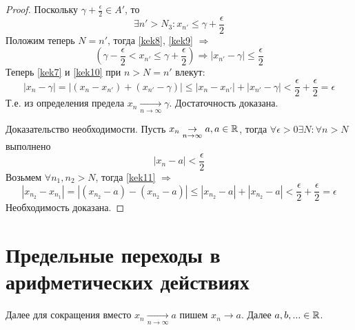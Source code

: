 \documentclass[main]{subfiles}
\begin{document}
\begin{proof}
    Поскольку $\gamma + \frac{\epsilon}{2} \in A'$, то 
    \begin{equation}\label{kek9}
        \exists n' > N_3 : x_{n'} \leq \gamma + \frac{\epsilon}{2}
    \end{equation}
    Положим теперь $N = n'$, тогда \ref{kek8}, \ref{kek9} $\Rightarrow$
    \begin{equation}\label{kek10}
        \left( 
            \gamma - \frac{\epsilon}{2} < x_{n'} \leq \gamma + \frac{\epsilon}{2}
        \right) \Rightarrow
        |x_{n'} - \gamma| \leq \frac{\epsilon}{2}
    \end{equation}
    Теперь \ref{kek7} и \ref{kek10} при $n > N = n'$ влекут:
    \begin{equation}
        |x_{n} - \gamma| = |(x_{n} - x_{n'}) + (x_{n'} - \gamma)| \leq 
        |x_{n} - x_{n'}| + |x_{n'} - \gamma| < \frac{\epsilon}{2} + 
        \frac{\epsilon}{2} = \epsilon
    \end{equation}
    Т.е. из определения предела $x_n \underset{n\to\infty}{\to} \gamma$.
    Достаточность доказана.

    Доказательство необходимости. Пусть $x_n \underset{n\to\infty}{\to} a,
    a \in \mathbb{R}$, тогда $\forall \epsilon > 0 \exists N : \forall n > N$
    выполнено 
    \begin{equation}\label{kek11}
        |x_n - a| < \frac{\epsilon}{2}
    \end{equation}
    Возьмем $\forall n_1, n_2 > N$, тогда \ref{kek11} $\Rightarrow$
    \begin{equation*}
        |x_{n_2} - x_{n_1}| = |(x_{n_2} - a) - (x_{n_2} - a)| \leq 
        |x_{n_2} - a| + |x_{n_2} - a| < \frac{\epsilon}{2} + \frac{\epsilon}{2} 
        = \epsilon
    \end{equation*}
    Необходимость доказана.
\end{proof}

\section{Предельные переходы в арифметических действиях}
Далее для сокращения вместо $x_n \underset{n\to\infty}{\to} a$ пишем
$x_n \to a$. Далее $a, b, ... \in \mathbb{R}$.
\end{document}
